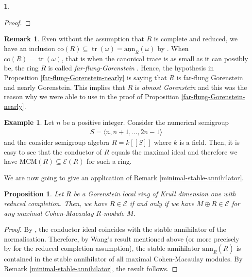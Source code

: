 \documentclass[12pt]{amsart}
\newcommand{\sann}{\underline{\mathrm{ann}}}
\newcommand\co{\mathrm{co}}
\newcommand{\MCM}{\mathrm{MCM}}
\newcommand{\EE}{\mathcal{E}}
\newtheorem{proposition}[theorem]{Proposition}
\theoremstyle{definition}
\newtheorem{example}[theorem]{Example}
\newtheorem{remark}[theorem]{Remark}
\newtheorem{chunk}[theorem]{}
\numberwithin{equation}{theorem}
\DeclareMathOperator{\tr}{\mathrm{tr}}
\begin{document}
\begin{chunk}
\begin{proof}
    \end{proof}
    \begin{remark}
        Even without the assumption that $R$ is complete and reduced, we have an inclusion $\co(R) \subseteq \tr(\omega) = \sann_R(\omega)$ by \cite[Proposition A.1]{Herzog-Takayuki-Dumitru}. When $\co(R) = \tr(\omega)$, that is when the canonical trace is as small as it can possibly be, the ring $R$ is called \textit{far-flung-Gorenstein} \cite{herzog-kumashiro-stamate}. Hence, the hypothesis in Proposition \ref{far-flung-Gorenstein-nearly} is saying that $R$ is far-flung Gorenstein and nearly Gorenstein. This implies that $R$ is \textit{almost Gorenstein} \cite[Proposition 1.1]{Huneke-Vraciu} and this was the reason why we were able to use \cite[Theorem 5.1]{goto-matsuoka-phuong} in the proof of Proposition \ref{far-flung-Gorenstein-nearly}.
    \end{remark}
    \begin{example}
        Let $n$ be a positive integer. Consider the numerical semigroup 
        \begin{align*}
            S = \langle n, n+1, \ldots, 2n-1\rangle
        \end{align*}
        and the consider semigroup algebra $R = k[[S]]$ where $k$ is a field. Then, it is easy to see that the conductor of $R$ equals the maximal ideal and therefore we have $\MCM(R) \subseteq \EE(R)$ for such a ring.
    \end{example}
    We are now going to give an application of Remark \ref{minimal-stable-annihilator}.
    \begin{proposition}
        Let $R$ be a Gorenstein local ring of Krull dimension one with reduced completion. Then, we have $\overline{R} \in \EE$ if and only if we have $M \oplus \overline{R} \in \EE$ for any maximal Cohen-Macaulay $R$-module $M$.
    \end{proposition}
    \begin{proof}
        By \cite[Corollary 4.2]{Esentepe}, the conductor ideal coincides with the stable annihilator of the normalisation. Therefore, by Wang's result \cite[Corollary 3.1]{Wang} mentioned above (or more precisely by \cite[Theorem 5.10]{Esentepe} for the reduced completion assumption), the stable annihilator $\sann_R(\overline{R})$
        is contained in the stable annihilator of all maximal Cohen-Macaulay modules. By Remark \ref{minimal-stable-annihilator}, the result follows.
    \end{proof}

\end{chunk}
\end{document}
